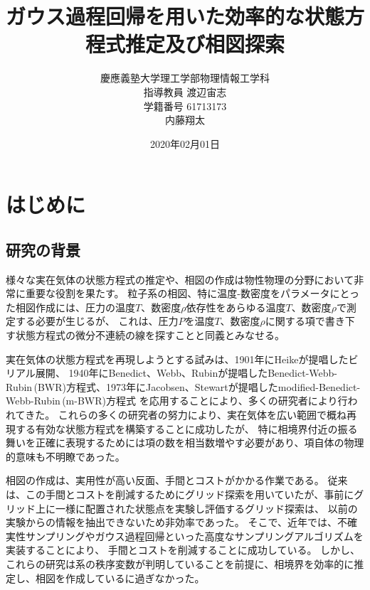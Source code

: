 \documentclass[titlepage]{jsreport}
\title{ガウス過程回帰を用いた効率的な状態方程式推定及び相図探索}
\author{慶應義塾大学理工学部物理情報工学科\\
指導教員 渡辺宙志\\
学籍番号 61713173\\
内藤翔太}
\date{2020年02月01日}
\begin{document}
\maketitle

\tableofcontents

\chapter{はじめに} \label{chap:introduction}

\section{研究の背景} \label{intro-background}
様々な実在気体の状態方程式の推定や、相図の作成は物性物理の分野において非常に重要な役割を果たす。
粒子系の相図、特に温度-数密度をパラメータにとった相図作成には、圧力の温度$T$、数密度$\rho$依存性をあらゆる温度$T$、数密度$\rho$で測定する必要が生じるが、
これは、圧力$P$を温度$T$、数密度$\rho$に関する項で書き下す状態方程式の微分不連続の線を探すことと同義とみなせる。

実在気体の状態方程式を再現しようとする試みは、1901年にHeikeが提唱したビリアル展開\cite{virial-Heike}、
1940年にBenedict、Webb、Rubinが提唱したBenedict-Webb-Rubin\,(BWR)方程式\cite{BWR-equation:original}、1973年にJacobsen、Stewartが提唱したmodified-Benedict-Webb-Rubin\,(m-BWR)方程式\cite{m-BWR-equation}
を応用することにより、多くの研究者により行われてきた\cite{MCCARTY1974276,BWR-equation:13,BWR-equation:25}。
これらの多くの研究者の努力により、実在気体を広い範囲で概ね再現する有効な状態方程式を構築することに成功したが、
特に相境界付近の振る舞いを正確に表現するためには項の数を相当数増やす必要があり、項自体の物理的意味も不明瞭であった。

相図の作成は、実用性が高い反面、手間とコストがかかる作業である。
従来は、この手間とコストを削減するためにグリッド探索\cite{grid1,grid2}を用いていたが、事前にグリッド上に一様に配置された状態点を実験し評価するグリッド探索は、
以前の実験からの情報を抽出できないため非効率であった。
そこで、近年では、不確実性サンプリング\cite{uncertainty-sampling1,uncertainty-sampling2}やガウス過程回帰\cite{gaussian-phase}といった高度なサンプリングアルゴリズムを実装することにより、
手間とコストを削減することに成功している。
しかし、これらの研究は系の秩序変数が判明していることを前提に、相境界を効率的に推定し、相図を作成しているに過ぎなかった。
\end{document}
